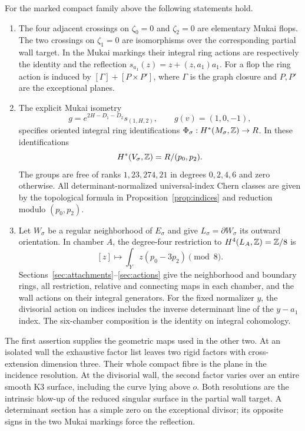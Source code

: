 \begin{theorem}\label{thm:main}
For the marked compact family above the following statements hold.
\begin{enumerate}
\item The four adjacent crossings on $\zeta_0=0$ and $\zeta_2=0$ are
elementary Mukai flops. The two crossings on $\zeta_1=0$ are
isomorphisms over the corresponding partial wall target. In the Mukai
markings their integral ring actions are respectively the identity and
the reflection $s_{a_1}(z)=z+(z,a_1)a_1$. For a flop the ring action is
induced by $[\Gamma]+[P\times P']$, where $\Gamma$ is the graph closure
and $P,P'$ are the exceptional planes.
\item The explicit Mukai isometry
\[
 g=e^{2H-D_1-D_2}s_{(1,H,2)},\qquad g(v)=(1,0,-1),
\]
specifies oriented integral ring identifications
$\Phi_\sigma:H^*(M_\sigma,\mathbb Z)\to R$. In these identifications
\begin{equation}\label{eq:complement-main}
 H^*(V_\sigma,\mathbb Z)=R/(p_0,p_2).
\end{equation}
The groups are free of ranks $1,23,274,21$ in degrees $0,2,4,6$ and
zero otherwise. All determinant-normalized universal-index Chern classes
are given by the topological formula in
Proposition~\ref{prop:indices} and reduction modulo $(p_0,p_2)$.
\item Let $W_\sigma$ be a regular neighborhood of $E_\sigma$ and give
$L_\sigma=\partial W_\sigma$ its outward orientation. In chamber $A$,
the degree-four restriction to $H^4(L_A,\mathbb Z)=\mathbb Z/8$ is
\begin{equation}\label{eq:kappa-intro}
 [z]\longmapsto\int_Yz(p_0-3p_2)\pmod8.
\end{equation}
Sections~\ref{sec:attachments}--\ref{sec:actions} give the neighborhood
and boundary rings, all restriction, relative and connecting maps in
each chamber, and the wall actions on their integral generators.
For the fixed normalizer $y$, the divisorial action on indices includes
the inverse determinant line of the $y-a_1$ index. The six-chamber
composition is the identity on integral cohomology.
\end{enumerate}
\end{theorem}

The first assertion supplies the geometric maps used in the other two.
At an isolated wall the exhaustive factor list leaves two rigid factors
with cross-extension dimension three. Their whole compact fibre is the
plane in the incidence resolution. At the divisorial wall, the second
factor varies over an entire smooth K3 surface, including the curve
lying above $o$. Both resolutions are the intrinsic blow-up of the
reduced singular surface in the partial wall target. A determinant
section has a simple zero on the exceptional divisor; its opposite
signs in the two Mukai markings force the reflection.


